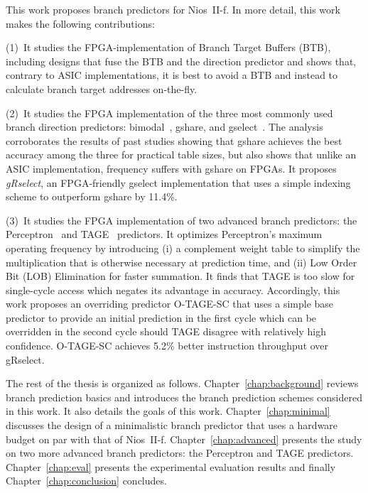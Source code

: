 This work proposes branch predictors for Nios~II-f. In more detail, this work makes the following contributions:

(1)~It studies the FPGA-implementation of Branch Target Buffers (BTB), including designs that fuse the BTB and the direction predictor and shows that, contrary to ASIC implementations, it is best to avoid a BTB and instead to calculate branch target addresses on-the-fly.

(2)~It studies the FPGA implementation of the three most commonly used branch direction predictors: bimodal~\cite{bimodal}, gshare, and gselect~\cite{McFarling}. The analysis corroborates the results of past studies showing that gshare achieves the best accuracy among the three for practical table sizes, but also shows that unlike an ASIC implementation, frequency suffers with gshare on FPGAs. It proposes \textit{gRselect}, an FPGA-friendly gselect implementation that uses a simple indexing scheme to outperform gshare by 11.4\%.

(3)~It studies the FPGA implementation of two advanced branch predictors: the Perceptron~\cite{perceptron} and TAGE~\cite{tage} predictors. It optimizes Perceptron's maximum operating frequency by introducing (i) a complement weight table to simplify the multiplication that is otherwise necessary at prediction time, and (ii) Low Order Bit (LOB) Elimination for faster summation. It finds that TAGE is too slow for single-cycle access which negates its advantage in accuracy. Accordingly, this work proposes an overriding predictor \mbox{O-TAGE-SC} that uses a simple base predictor to provide an initial prediction in the first cycle which can be overridden in the second cycle should TAGE disagree with relatively high confidence. \mbox{O-TAGE-SC} achieves 5.2\% better instruction throughput over gRselect.

The rest of the thesis is organized as follows. Chapter~\ref{chap:background} reviews branch prediction basics and introduces the branch prediction schemes considered in this work. It also details the goals of this work. Chapter~\ref{chap:minimal} discusses the design of a minimalistic branch predictor that uses a hardware budget on par with that of Nios~II-f. Chapter~\ref{chap:advanced} presents the study on two more advanced branch predictors: the Perceptron and TAGE predictors. Chapter~\ref{chap:eval} presents the experimental evaluation results and finally Chapter~\ref{chap:conclusion} concludes.





